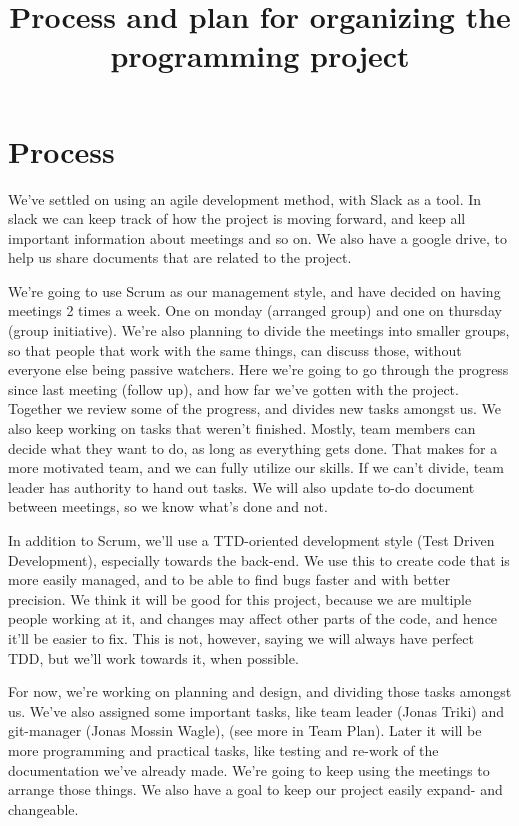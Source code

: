 \documentclass{article}
\title{Process and plan for organizing the programming project}
\date{}
\begin{document}
\maketitle
\section*{Process}
We’ve settled on using an agile development method, with Slack as a tool. In slack we can keep track of how the project is moving forward, and keep all important information about meetings and so on. We also have a google drive, to help us share documents that are related to the project.

We’re going to use Scrum as our management style, and have decided on having meetings 2 times a week. One on monday (arranged group) and one on thursday (group initiative). We’re also planning to divide the meetings into smaller groups, so that people that work with the same things, can discuss those, without everyone else being passive watchers.
Here we’re going to go through the progress since last meeting (follow up), and how far we’ve gotten with the project. Together we review some of the progress, and divides new tasks amongst us. We also keep working on tasks that weren’t finished. Mostly, team members can decide what they want to do, as long as everything gets done. That makes for a more motivated team, and we can fully utilize our skills. If we can't divide, team leader has authority to hand out tasks. We will also update to-do document between meetings, so we know what's done and not.

In addition to Scrum, we'll use a TTD-oriented development style (Test Driven Development), especially towards the back-end. We use this to create code that is more easily managed, and to be able to find bugs faster and with better precision. We think it will be good for this project, because we are multiple people working at it, and changes may affect other parts of the code, and hence it'll be easier to fix. This is not, however, saying we will always have perfect TDD, but we'll work towards it, when possible.

For now, we’re working on planning and design, and dividing those tasks amongst us. We’ve also assigned some important tasks, like team leader (Jonas Triki) and git-manager (Jonas Mossin Wagle), (see more in Team Plan). Later it will be more programming and practical tasks, like testing and re-work of the documentation we’ve already made. We’re going to keep using the meetings to arrange those things. We also have a goal to keep our project easily expand- and changeable.
\end{document}
